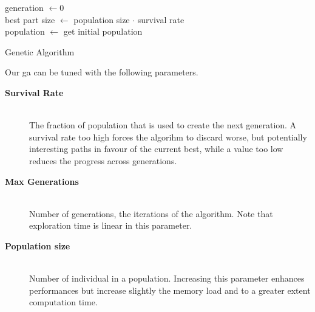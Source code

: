\documentclass[journal]{IEEEtran}
\begin{document}
\begin{algorithm}
	generation $\gets 0$\\
	best part size $\gets$ population size $\cdot$ survival rate\\
	population $\gets$ get initial population\\
	\caption{Genetic Algorithm}\label{algo:GA}
\end{algorithm}

Our \gls{ga} can be tuned with the following parameters.
\begin{description}
	\item[\textbf{Survival Rate}] \hfill \\
	The fraction of population that is used to create the next generation. A survival rate too high forces the algorihm to discard worse, but potentially interesting paths in favour of the current best, while a value too low reduces the progress across generations.
	\item[\textbf{Max Generations}] \hfill \\
	Number of generations, the iterations of the algorithm. Note that exploration time is linear in this parameter.
	\item[\textbf{Population size}] \hfill \\
	Number of individual in a population. Increasing this parameter enhances performances but increase slightly the memory load and to a greater extent computation time.
\end{description}
\end{document}
